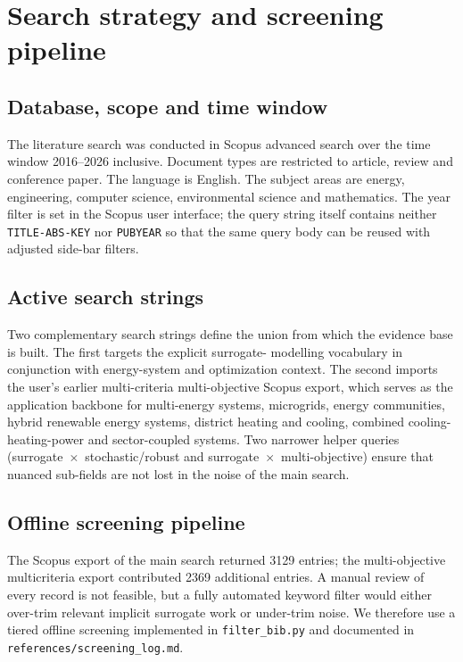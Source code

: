 \section{Search strategy and screening pipeline}
\label{app:search}

\subsection{Database, scope and time window}
\label{app:search:scope}

The literature search was conducted in Scopus advanced search over
the time window 2016--2026 inclusive. Document types are restricted
to article, review and conference paper. The language is English.
The subject areas are energy, engineering, computer science,
environmental science and mathematics. The year filter is set in the
Scopus user interface; the query string itself contains neither
\texttt{TITLE-ABS-KEY} nor \texttt{PUBYEAR} so that the same query
body can be reused with adjusted side-bar filters.

\subsection{Active search strings}
\label{app:search:strings}

Two complementary search strings define the union from which the
evidence base is built. The first targets the explicit surrogate-
modelling vocabulary in conjunction with energy-system and
optimization context. The second imports the user's earlier
multi-criteria multi-objective Scopus export, which serves as the
application backbone for multi-energy systems, microgrids, energy
communities, hybrid renewable energy systems, district heating and
cooling, combined cooling-heating-power and sector-coupled systems.
Two narrower helper queries (surrogate~$\times$~stochastic/robust
and surrogate~$\times$~multi-objective) ensure that nuanced
sub-fields are not lost in the noise of the main search.

\subsection{Offline screening pipeline}
\label{app:search:offline}

The Scopus export of the main search returned 3129 entries; the
multi-objective multicriteria export contributed 2369 additional
entries. A manual review of every record is not feasible, but a
fully automated keyword filter would either over-trim relevant
implicit surrogate work or under-trim noise. We therefore use a
tiered offline screening implemented in \texttt{filter\_bib.py} and
documented in \texttt{references/screening\_log.md}.

